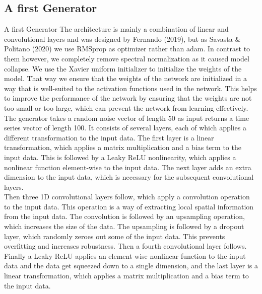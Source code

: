 \documentclass{article}
\begin{document}
\begin{multicols}{2}
    \section{A first Generator}
    A first Generator
    The architecture is mainly a combination of linear and convolutional layers and was designed by Fernando (2019), but as Savasta \& Politano (2020) we use RMSprop as optimizer rather than adam. In contrast to them however, we completely remove spectral normalization as it caused model collapse. We use the Xavier uniform initializer to initialize the weights of the model. That way we ensure that the weights of the network are initialized in a way that is well-suited to the activation functions used in the network. This helps to improve the performance of the network by ensuring that the weights are not too small or too large, which can prevent the network from learning effectively. \\
    The generator takes a random noise vector of length 50 as input returns a time series vector of length 100. It consists of several layers, each of which applies a different transformation to the input data. The first layer is a linear transformation, which applies a matrix multiplication and a bias term to the input data. This is followed by a Leaky ReLU nonlinearity, which applies a nonlinear function element-wise to the input data. The next layer adds an extra dimension to the input data, which is necessary for the subsequent convolutional layers. \\
    Then three 1D convolutional layers follow, which apply a convolution operation to the input data. This operation is a way of extracting local spatial information from the input data. The convolution is followed by an upsampling operation, which increases the size of the data. The upsampling is followed by a dropout layer, which randomly zeroes out some of the input data. This prevents overfitting and increases robustness. Then a fourth convolutional layer follows. \\
    Finally a Leaky ReLU applies an element-wise nonlinear function to the input data and the data get squeezed down to a single dimension, and the last layer is a linear transformation, which applies a matrix multiplication and a bias term to the input data.
    \begin{center}

\end{center}
\end{multicols}
\end{document}
